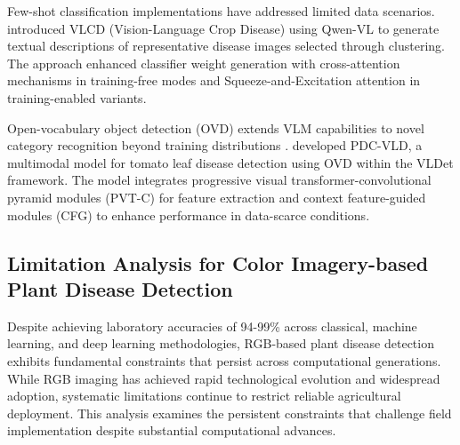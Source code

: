 \documentclass[sn-mathphys]{sn-jnl}
\theoremstyle{thmstyleone}%
\theoremstyle{thmstyletwo}%
\theoremstyle{thmstylethree}%
\begin{document}
Few-shot classification implementations have addressed limited data scenarios. \citet{zhou2024few} introduced VLCD (Vision-Language Crop Disease) using Qwen-VL \citep{bai2023qwen} to generate textual descriptions of representative disease images selected through clustering. The approach enhanced classifier weight generation with cross-attention mechanisms in training-free modes and Squeeze-and-Excitation attention in training-enabled variants.

Open-vocabulary object detection (OVD) extends VLM capabilities to novel category recognition beyond training distributions \citep{zareian2021open}. \citet{li2024multi} developed PDC-VLD, a multimodal model for tomato leaf disease detection using OVD within the VLDet framework. The model integrates progressive visual transformer-convolutional pyramid modules (PVT-C) for feature extraction and context feature-guided modules (CFG) to enhance performance in data-scarce conditions.

\subsection{Limitation Analysis for Color Imagery-based Plant Disease Detection}
Despite achieving laboratory accuracies of 94-99\% across classical, machine learning, and deep learning methodologies, RGB-based plant disease detection exhibits fundamental constraints that persist across computational generations. While RGB imaging has achieved rapid technological evolution and widespread adoption, systematic limitations continue to restrict reliable agricultural deployment. This analysis examines the persistent constraints that challenge field implementation despite substantial computational advances.
\end{document}
